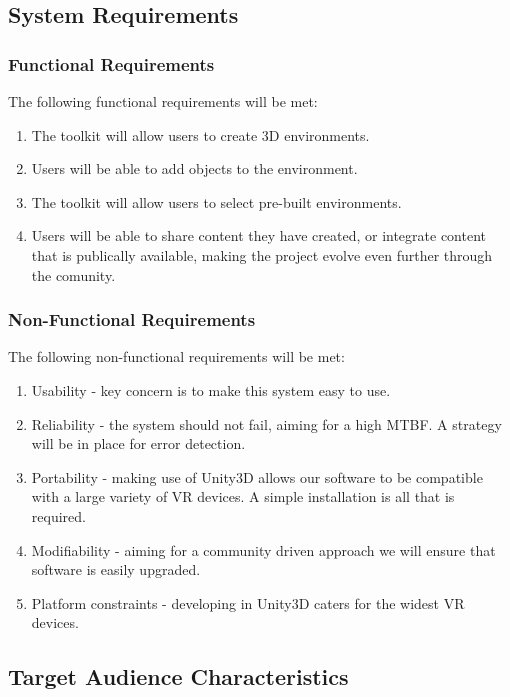 \subsection{System Requirements}

	\subsubsection{Functional Requirements}
	
	The following functional requirements will be met:
  	
  		\begin{enumerate}
			\item The toolkit will allow users to create 3D environments.
			\item Users will be able to add objects to the environment.
			\item The toolkit will allow users to select pre-built environments.
			\item Users will be able to share content they have created, or integrate content that is publically available, making the project evolve even further through the comunity.
		\end{enumerate}

	\subsubsection{Non-Functional Requirements}

	The following non-functional requirements will be met:

		\begin{enumerate}
  			\item Usability - key concern is to make this system easy to use.
  			\item Reliability - the system should not fail, aiming for a high MTBF. A strategy will be in place for error detection.
  			\item Portability - making use of Unity3D allows our software to be compatible with a large variety of VR devices. A simple installation is all that is required.
  			\item Modifiability - aiming for a community driven approach we will ensure that software is easily upgraded.
  			\item Platform constraints - developing in Unity3D caters for the widest VR devices.  			
		\end{enumerate}

\subsection{Target Audience Characteristics}

